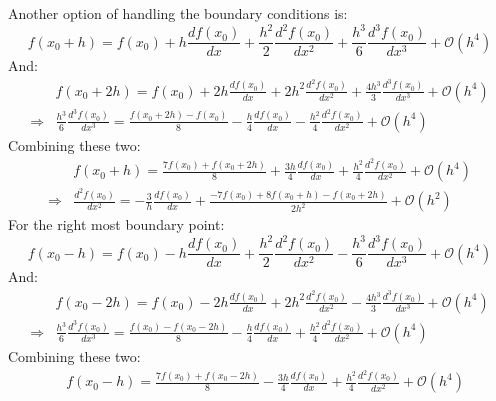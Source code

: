 \documentclass[12pt,a4]{article}
\begin{document}
\begin{enumerate}
\begin{enumerate}
\begin{figure}[H]
          \label{fig:profile}
        \end{figure}
        Another option of handling the boundary conditions is:
        \begin{equation*}
          f(x_0 + h ) = f(x_0) + h \frac{d f(x_0)}{dx} + \frac{h^2}{2} \frac{d^2 f(x_0)}{dx^2} + \frac{h^3}{6} \frac{d^3 f(x_0)}{dx^3} + \mathscr{O} (h^4)
        \end{equation*}
        And:
        \begin{align*}
                      & f(x_0 + 2h ) = f(x_0) + 2h \frac{d f(x_0)}{dx} + 2h^2 \frac{d^2 f(x_0)}{dx^2} + \frac{4 h^3}{3} \frac{d^3 f(x_0)}{dx^3} + \mathscr{O} (h^4)\\
          \Rightarrow & \frac{h^3}{6} \frac{d^3 f(x_0)}{dx^3} = \frac{f(x_0 + 2h) - f(x_0) }{8} - \frac{h}{4} \frac{d f(x_0)}{dx} - \frac{h^2}{4} \frac{d^2 f(x_0)}{dx^2} + \mathscr{O} (h^4)
        \end{align*}
        Combining these two:
        \begin{align*}
                      & f(x_0 + h) = \frac{7 f(x_0) + f(x_0 + 2h)}{8} + \frac{3 h}{4} \frac{d f(x_0)}{dx} + \frac{h^2}{4} \frac{d^2 f(x_0)}{dx^2} + \mathscr{O} (h^4)\\
          \Rightarrow &  \frac{d^2 f(x_0)}{dx^2} = - \frac{3}{h} \frac{d f(x_0)}{dx} + \frac{- 7 f(x_0) + 8 f(x_0 + h) - f(x_0 + 2h)}{2 h^2} + \mathscr{O} (h^2)
        \end{align*}
        For the right most boundary point:
        \begin{equation*}
          f(x_0 - h ) = f(x_0) - h \frac{d f(x_0)}{dx} + \frac{h^2}{2} \frac{d^2 f(x_0)}{dx^2} - \frac{h^3}{6} \frac{d^3 f(x_0)}{dx^3} + \mathscr{O} (h^4)
        \end{equation*}
        And:
        \begin{align*}
                      & f(x_0 - 2h ) = f(x_0) - 2h \frac{d f(x_0)}{dx} + 2h^2 \frac{d^2 f(x_0)}{dx^2} - \frac{4 h^3}{3} \frac{d^3 f(x_0)}{dx^3} + \mathscr{O} (h^4)\\
          \Rightarrow & \frac{h^3}{6} \frac{d^3 f(x_0)}{dx^3} = \frac{f(x_0) - f(x_0 - 2h)}{8} - \frac{h}{4} \frac{d f(x_0)}{dx} + \frac{h^2}{4} \frac{d^2 f(x_0)}{dx^2} + \mathscr{O} (h^4)
        \end{align*}
        Combining these two:
        \begin{align*}
                      & f(x_0 - h) = \frac{7 f(x_0) + f(x_0 - 2h)}{8} - \frac{3 h}{4} \frac{d f(x_0)}{dx} + \frac{h^2}{4} \frac{d^2 f(x_0)}{dx^2} + \mathscr{O} (h^4)\\

\end{align*}
\end{enumerate}
\end{enumerate}
\end{document}
